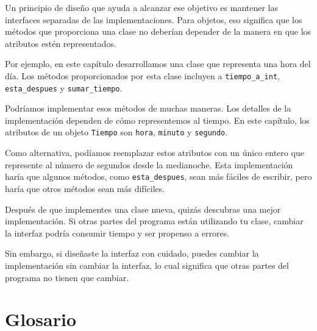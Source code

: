 \documentclass[10pt]{book}
\begin{document}
Un principio de diseño que ayuda a alcanzar ese objetivo es mantener
las interfaces separadas de las implementaciones.  Para objetos, eso significa
que los métodos que proporciona una clase no deberían depender de la manera en que los
atributos estén representados.

Por ejemplo, en este capítulo desarrollamos una clase que representa
una hora del día.  Los métodos proporcionados por esta clase incluyen a
\verb"tiempo_a_int", \verb"esta_despues" y \verb"sumar_tiempo".

Podríamos implementar esos métodos de muchas maneras.  Los detalles de la
implementación dependen de cómo representemos al tiempo.  En este capítulo, los
atributos de un objeto {\tt Tiempo} son {\tt hora}, {\tt minuto} y
{\tt segundo}.

Como alternativa, podíamos reemplazar estos atributos con
un único entero que represente al número de segundos
desde la medianoche.  Esta implementación haría que algunos métodos,
como \verb"esta_despues", sean más fáciles de escribir, pero haría que otros métodos sean
más difíciles.

Después de que implementes una clase nueva, quizás descubras una mejor
implementación.  Si otras partes del programa están utilizando tu
clase, cambiar la interfaz podría consumir tiempo y ser propenso a
errores.

Sin embargo, si diseñaste la interfaz con cuidado, puedes
cambiar la implementación sin cambiar la interfaz, lo cual
significa que otras partes del programa no tienen que cambiar.


\section{Glosario}
\end{document}
